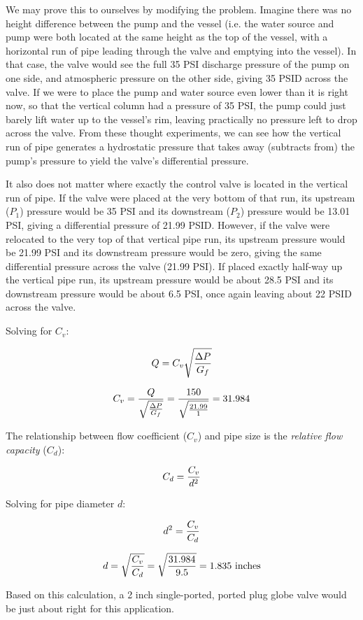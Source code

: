 We may prove this to ourselves by modifying the problem.  Imagine there was no height difference between the pump and the vessel (i.e. the water source and pump were both located at the same height as the top of the vessel, with a horizontal run of pipe leading through the valve and emptying into the vessel).  In that case, the valve would see the full 35 PSI discharge pressure of the pump on one side, and atmospheric pressure on the other side, giving 35 PSID across the valve.  If we were to place the pump and water source even lower than it is right now, so that the vertical column had a pressure of 35 PSI, the pump could just barely lift water up to the vessel's rim, leaving practically no pressure left to drop across the valve.  From these thought experiments, we can see how the vertical run of pipe generates a hydrostatic pressure that takes away (subtracts from) the pump's pressure to yield the valve's differential pressure.

It also does not matter where exactly the control valve is located in the vertical run of pipe.  If the valve were placed at the very bottom of that run, its upstream ($P_1$) pressure would be 35 PSI and its downstream ($P_2$) pressure would be 13.01 PSI, giving a differential pressure of 21.99 PSID.  However, if the valve were relocated to the very top of that vertical pipe run, its upstream pressure would be 21.99 PSI and its downstream pressure would be zero, giving the same differential pressure across the valve (21.99 PSI).  If placed exactly half-way up the vertical pipe run, its upstream pressure would be about 28.5 PSI and its downstream pressure would be about 6.5 PSI, once again leaving about 22 PSID across the valve.

\vskip 10pt

Solving for $C_v$:

$$Q = C_v \sqrt{\Delta P \over G_f}$$

$$C_v = {Q \over \sqrt{\Delta P \over G_f}} = {150 \over \sqrt{21.99 \over 1}} = 31.984$$

The relationship between flow coefficient ($C_v$) and pipe size is the {\it relative flow capacity} ($C_d$):

$$C_d = {C_v \over d^2}$$

Solving for pipe diameter $d$:

$$d^2 = {C_v \over C_d}$$

$$d = \sqrt{C_v \over C_d} = \sqrt{31.984 \over 9.5} = 1.835 \hbox{ inches}$$

Based on this calculation, a 2 inch single-ported, ported plug globe valve would be just about right for this application.




